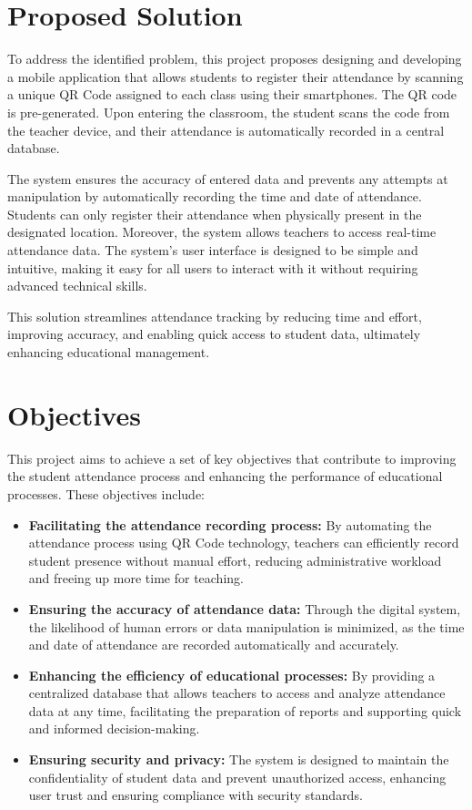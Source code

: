 \documentclass[12pt,a4paper]{report}
\begin{document}




\section{Proposed Solution}
To address the identified problem, this project proposes designing and developing a mobile application that allows students to register their attendance by scanning a unique QR Code assigned to each class using their smartphones. The QR code is pre-generated. Upon entering the classroom, the student scans the code from the teacher device, and their attendance is automatically recorded in a central database.

The system ensures the accuracy of entered data and prevents any attempts at manipulation by automatically recording the time and date of attendance. Students can only register their attendance when physically present in the designated location. Moreover, the system allows teachers to access real-time attendance data. The system's user interface is designed to be simple and intuitive, making it easy for all users to interact with it without requiring advanced technical skills.

This solution streamlines attendance tracking by reducing time and effort, improving accuracy, and enabling quick access to student data, ultimately enhancing educational management.

\section{Objectives}
This project aims to achieve a set of key objectives that contribute to improving the student attendance process and enhancing the performance of educational processes. These objectives include:

\begin{itemize}
    \item \textbf{Facilitating the attendance recording process:} By automating the attendance process using QR Code technology, teachers can efficiently record student presence without manual effort, reducing administrative workload and freeing up more time for teaching.
    \item \textbf{Ensuring the accuracy of attendance data:} Through the digital system, the likelihood of human errors or data manipulation is minimized, as the time and date of attendance are recorded automatically and accurately.
    \item \textbf{Enhancing the efficiency of educational processes:} By providing a centralized database that allows teachers to access and analyze attendance data at any time, facilitating the preparation of reports and supporting quick and informed decision-making.
    \item \textbf{Ensuring security and privacy:} The system is designed to maintain the confidentiality of student data and prevent unauthorized access, enhancing user trust and ensuring compliance with security standards.
\end{itemize}
\end{document}
